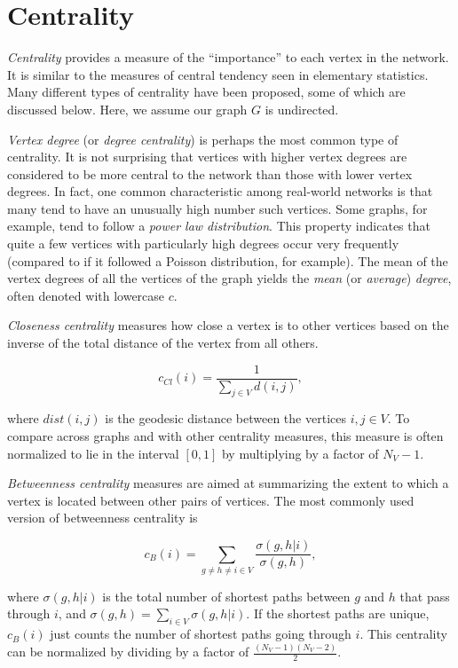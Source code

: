 \documentclass[12pt,twoside]{amherstthesis}
\begin{document}
  \section{Centrality}\label{centrality}
  
  \emph{Centrality} provides a measure of the ``importance'' to each
  vertex in the network. It is similar to the measures of central tendency
  seen in elementary statistics. Many different types of centrality have
  been proposed, some of which are discussed below. Here, we assume our
  graph \(G\) is undirected.
  
  \emph{Vertex degree} (or \emph{degree centrality}) is perhaps the most
  common type of centrality. It is not surprising that vertices with
  higher vertex degrees are considered to be more central to the network
  than those with lower vertex degrees. In fact, one common characteristic
  among real-world networks is that many tend to have an unusually high
  number such vertices. Some graphs, for example, tend to follow a
  \emph{power law distribution}. This property indicates that quite a few
  vertices with particularly high degrees occur very frequently (compared
  to if it followed a Poisson distribution, for example). The mean of the
  vertex degrees of all the vertices of the graph yields the \emph{mean}
  (or \emph{average}) \emph{degree}, often denoted with lowercase \(c\).
  
  \emph{Closeness centrality} measures how close a vertex is to other
  vertices based on the inverse of the total distance of the vertex from
  all others.
  
  \[c_{Cl}(i) = \frac {1} {\sum_{j \in V}^{} d(i, j)},\]
  
  where \(dist(i,j)\) is the geodesic distance between the vertices
  \(i,j \in V\). To compare across graphs and with other centrality
  measures, this measure is often normalized to lie in the interval
  \([0,1]\) by multiplying by a factor of \(N_V - 1\).
  
  \emph{Betweenness centrality} measures are aimed at summarizing the
  extent to which a vertex is located between other pairs of vertices. The
  most commonly used version of betweenness centrality is
  
  \[c_{B}(i) = \sum_{g \neq h \neq i \in V}^{} \frac {\sigma(g,h|i)} {\sigma(g,h)},\]
  
  where \(\sigma(g,h|i)\) is the total number of shortest paths between
  \(g\) and \(h\) that pass through \(i\), and
  \(\sigma(g,h) = \sum_{i \in V}^{} \sigma(g,h|i)\). If the shortest paths
  are unique, \(c_{B}(i)\) just counts the number of shortest paths going
  through \(i\). This centrality can be normalized by dividing by a factor
  of \(\frac {(N_V - 1)(N_V - 2)} {2}\).
  
\end{document}
